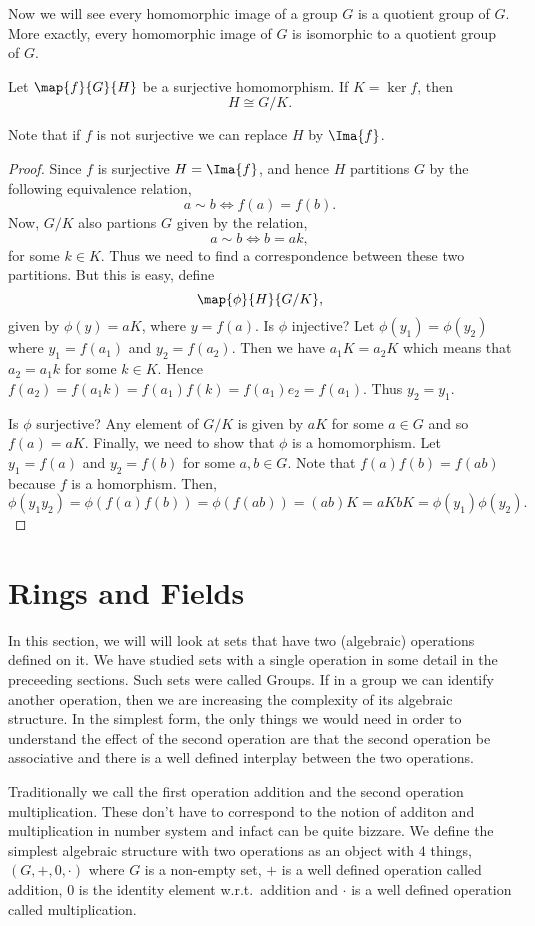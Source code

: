 Now we will see every homomorphic image of a group $G$ is a quotient group of $G$. More exactly, every
homomorphic image of $G$ is isomorphic to a quotient group of $G$. 
\begin{Theorem}[name=Fundamental homomorphism theorem]
    Let $\map{f}{G}{H}$ be a surjective homomorphism. If $K = \ker{f}$, then
    \[H\cong G/K.\]
\end{Theorem}
Note that if $f$ is not surjective we can replace $H$ by $\Ima{f}$.
\begin{proof}
    Since $f$ is surjective $H =  \Ima{f}$, and hence $H$ partitions $G$ by the following equivalence
    relation,
    \[a\sim b \iff f(a) = f(b).\]
    Now, $G/K$ also partions $G$ given by the relation,
    \[a \sim b \iff b = ak,\]
    for some $k \in K$.
    Thus we need to find a correspondence between these two partitions. But this is easy, define
    \[\map{\phi}{H}{G/K},\]
    given by $\phi(y) = aK$, where $y = f(a)$.
    Is $\phi$ injective?
    Let $\phi(y_1) = \phi(y_2)$ where $y_1 = f(a_1)$ and $y_2 = f(a_2)$. Then we have $a_1K = a_2K$ which
    means that $a_2 = a_1k$ for some $k \in K$. Hence $f(a_2) = f(a_1k) = f(a_1)f(k) = f(a_1)e_2 = f(a_1)$.
    Thus $y_2 = y_1$.

    Is $\phi$ surjective? Any element of $G/K$ is given by $aK$ for some $a \in G$ and so $f(a) = aK$.
    Finally, we need to show that $\phi$ is a homomorphism. Let $y_1 = f(a)$ and $y_2 = f(b)$ for some $a,b
    \in G$. Note that $f(a)f(b) = f(ab)$ because $f$ is a homorphism. Then,
    \[\phi(y_1y_2) = \phi(f(a)f(b)) = \phi(f(ab)) = (ab)K = aKbK = \phi(y_1)\phi(y_2).\]
\end{proof}
\section{Rings and Fields}
In this section, we will will look at sets that have two (algebraic) operations defined on it. We have studied
sets with a single operation in some detail in the preceeding sections. Such sets were called Groups. If in
a group we can identify another operation, then we are increasing the complexity of its algebraic structure.
In the simplest form, the only things we would need in order to understand the effect of the second operation
are that the second operation be associative and there is a well defined interplay between the two operations.

Traditionally we call the first operation addition and the second operation multiplication. These don't have
to correspond to the notion of additon and multiplication in number system and infact can be quite bizzare. We
define the simplest algebraic structure with two operations as an object with $4$ things,
$\left(G,+,0,\cdot\right)$ where $G$ is a non-empty set, $+$ is a well defined operation called addition, 
$0$ is the identity element w.r.t.~addition and $\cdot$ is a well defined operation called multiplication.

